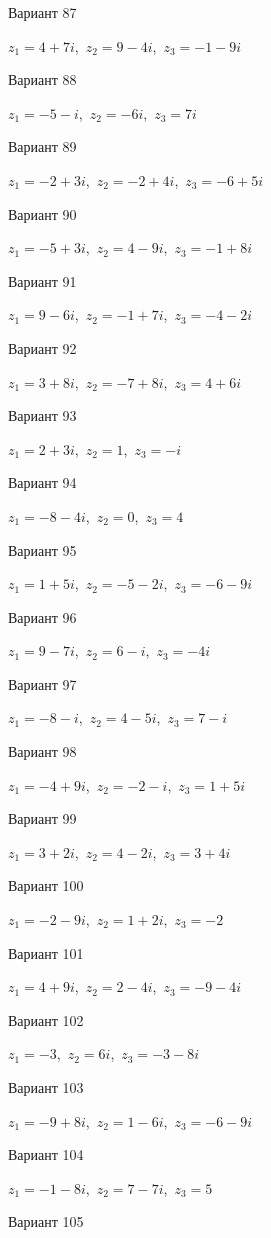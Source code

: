 \documentclass[11pt]{report}
\begin{document}
Вариант 87

$z_1 = 4 + 7 i$,\ $z_2 = 9 - 4 i$,\ $z_3 = -1 - 9 i$

Вариант 88

$z_1 = -5 - i$,\ $z_2 = - 6 i$,\ $z_3 = 7 i$

Вариант 89

$z_1 = -2 + 3 i$,\ $z_2 = -2 + 4 i$,\ $z_3 = -6 + 5 i$

Вариант 90

$z_1 = -5 + 3 i$,\ $z_2 = 4 - 9 i$,\ $z_3 = -1 + 8 i$

Вариант 91

$z_1 = 9 - 6 i$,\ $z_2 = -1 + 7 i$,\ $z_3 = -4 - 2 i$

Вариант 92

$z_1 = 3 + 8 i$,\ $z_2 = -7 + 8 i$,\ $z_3 = 4 + 6 i$

Вариант 93

$z_1 = 2 + 3 i$,\ $z_2 = 1$,\ $z_3 = - i$

Вариант 94

$z_1 = -8 - 4 i$,\ $z_2 = 0$,\ $z_3 = 4$

Вариант 95

$z_1 = 1 + 5 i$,\ $z_2 = -5 - 2 i$,\ $z_3 = -6 - 9 i$

Вариант 96

$z_1 = 9 - 7 i$,\ $z_2 = 6 - i$,\ $z_3 = - 4 i$

Вариант 97

$z_1 = -8 - i$,\ $z_2 = 4 - 5 i$,\ $z_3 = 7 - i$

Вариант 98

$z_1 = -4 + 9 i$,\ $z_2 = -2 - i$,\ $z_3 = 1 + 5 i$

Вариант 99

$z_1 = 3 + 2 i$,\ $z_2 = 4 - 2 i$,\ $z_3 = 3 + 4 i$

Вариант 100

$z_1 = -2 - 9 i$,\ $z_2 = 1 + 2 i$,\ $z_3 = -2$

Вариант 101

$z_1 = 4 + 9 i$,\ $z_2 = 2 - 4 i$,\ $z_3 = -9 - 4 i$

Вариант 102

$z_1 = -3$,\ $z_2 = 6 i$,\ $z_3 = -3 - 8 i$

Вариант 103

$z_1 = -9 + 8 i$,\ $z_2 = 1 - 6 i$,\ $z_3 = -6 - 9 i$

Вариант 104

$z_1 = -1 - 8 i$,\ $z_2 = 7 - 7 i$,\ $z_3 = 5$

Вариант 105
\end{document}

